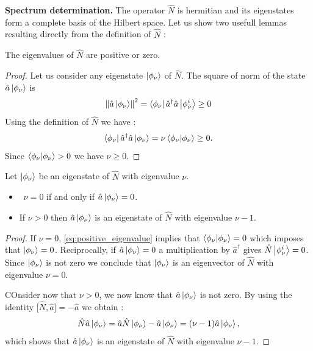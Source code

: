 \textbf{Spectrum determination.} The operator $\hat{N}$ is hermitian and its eigenstates form a complete basis of the Hilbert space. Let us 
show two usefull lemmas resulting directly from the definition of $\hat{N}$ :

\begin{lemma}
    The eigenvalues of $\hat{N}$ are positive or zero.
\end{lemma}

\begin{proof}
    Let us consider any eigenstate $\ket{\phi_\nu}$ of $\hat{N}$. The square of norm of the state $\hat{a}\ket{\phi_\nu}$ is 
    \begin{equation}
            \norm{\hat{a}\ket{\phi_\nu}}^2=\bra{\phi_\nu}\hat{a}^\dagger\hat{a}\ket{\phi^i_\nu} \geq 0   
\end{equation}
    Using the definition of $\hat{N}$ we have :
    \begin{equation}
        \label{eq:positive_eigenvalue}
        \bra{\phi_\nu}\hat{a}^\dagger\hat{a}\ket{\phi_\nu}=\nu\bra{\phi_\nu}\ket{\phi_\nu} \geq 0.
    \end{equation}
Since $\bra{\phi_\nu}\ket{\phi_\nu}>0$ we have $\nu\geq 0$.
\end{proof}

\begin{lemma}
    Let $\ket{\phi_\nu}$ be an eigenstate of $\hat{N}$ with eigenvalue $\nu$.
    \begin{itemize}
        \item \ $\nu=0$ if and only if $\hat{a}\ket{\phi_\nu}=0$.
        \item If $\nu>0$ then $\hat{a}\ket{\phi_\nu}$ is an eigenstate of $\hat{N}$ with eigenvalue $\nu-1$.
    \end{itemize}
\end{lemma}

\begin{proof}
    If $\nu=0$, \autoref{eq:positive_eigenvalue} implies that $\bra{\phi_\nu}\ket{\phi_\nu}=0$ which imposes that $\ket{\phi_\nu}=0$.
    Reciprocally, if $\hat{a}\ket{\phi_\nu}=0$ a multiplication by $\hat{a}^\dagger$ gives $\hat{N}\ket{\phi^i_\nu}=0$. Since $\ket{\phi_\nu}$ is not zero we conclude
    that $\ket{\phi_\nu}$ is an eigenvector of $\hat{N}$ with eigenvalue $\nu =0$.

    COnsider now that $\nu>0$, we now know that $\hat{a}\ket{\phi_\nu}$ is not zero. By using the identity $\bigl[\hat{N},\hat{a}\bigr] = -\hat{a}$ we 
    obtain :
    \begin{equation}
        \hat{N}\hat{a}\ket{\phi_\nu}=\hat{a}\hat{N}\ket{\phi_\nu}-\hat{a}\ket{\phi_\nu}=(\nu-1)\hat{a}\ket{\phi_\nu},
    \end{equation}
    which shows that $\hat{a}\ket{\phi_\nu}$ is an eigenstate of $\hat{N}$ with eigenvalue $\nu-1$.
\end{proof}

